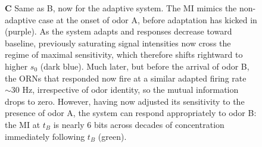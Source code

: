 \documentclass[9pt,twoside]{pnas-new}
\begin{document}
\begin{figure}
{\textbf{C} Same as B, now for the adaptive system. The MI mimics the non-adaptive case at the onset of odor A, before adaptation has kicked in (purple). As the system adapts and responses decrease toward baseline, previously saturating signal intensities now cross the regime of maximal sensitivity, which therefore shifts rightward to higher $s_0$ (dark blue). Much later, but before the arrival of odor B, the ORNs that responded now fire at a similar  adapted firing rate $\sim 30$ Hz, irrespective of odor identity, so the mutual information drops to zero. However, having now adjusted its sensitivity to the presence of odor A, the system can respond appropriately to odor B: the MI at $t_B$ is nearly 6 bits across decades of concentration immediately following $t_B$ (green). 
}
\label{fig:SI_MI}
\end{figure}
\end{document}
